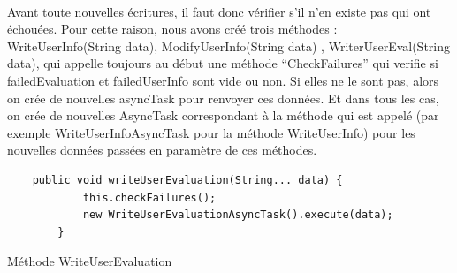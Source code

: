 \documentclass[a4paper, 10pt]{article}
\begin{document}
\paragraph{}
Avant toute nouvelles écritures, il faut donc vérifier s’il n’en existe pas qui ont échouées.
Pour cette raison, nous avons créé trois méthodes : WriteUserInfo(String data), ModifyUserInfo(String data) , WriterUserEval(String data), qui appelle toujours au début une méthode “CheckFailures” qui verifie si failedEvaluation et failedUserInfo sont vide ou non. Si elles ne le sont pas, alors on crée de nouvelles asyncTask pour renvoyer ces données. Et dans tous les cas, on crée de nouvelles AsyncTask correspondant à la méthode qui est appelé (par exemple WriteUserInfoAsyncTask pour la méthode WriteUserInfo) pour les nouvelles données passées en paramètre de ces méthodes.
\hfill \break
\begin{lstlisting}
	public void writeUserEvaluation(String... data) {
        	this.checkFailures();
        	new WriteUserEvaluationAsyncTask().execute(data);
    	}
\end{lstlisting}
Méthode WriteUserEvaluation
	
\end{document}
